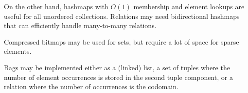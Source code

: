 \documentclass{article}
\begin{document}
On the other hand, hashmaps with $O(1)$ membership and element lookups are useful for all unordered collections. Relations may need bidirectional hashmaps that can efficiently handle many-to-many relations.

Compressed bitmaps may be used for sets, but require a lot of space for sparse elements.

Bags may be implemented either as a (linked) list, a set of tuples where the number of element occurrences is stored in the second tuple component, or a relation where the number of occurrences is the codomain.
\end{document}
